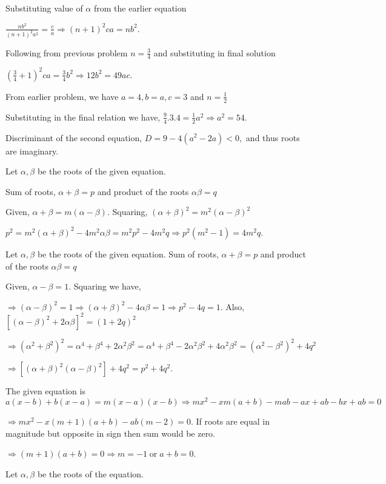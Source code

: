   Substituting value of $\alpha$ from the earlier equation

  $\frac{nb^2}{(n + 1)^2a^2} = \frac{c}{a} \Rightarrow (n + 1)^2 ca = nb^2$.
\item Following from previous problem $n = \frac{3}{4}$ and substituting in final solution

  $\left(\frac{3}{4} + 1\right)^2ca = \frac{3}{4}b^2 \Rightarrow 12b^2 = 49ac$.
\item From earlier problem, we have $a = 4, b = a, c = 3$ and $n = \frac{1}{2}$

  Substituting in the final relation we have, $\frac{9}{4}.3.4 = \frac{1}{2}a^2\Rightarrow a^2 = 54$.

  Discriminant of the second equation, $D = 9 - 4(a^2 - 2a) < 0,$ and thus roots are imaginary.
\item Let $\alpha, \beta$ be the roots of the given equation.

  Sum of roots, $\alpha + \beta = p$ and product of the roots $\alpha\beta = q$

  Given, $\alpha + \beta = m(\alpha - \beta)$. Squaring, $(\alpha + \beta)^2 = m^2(\alpha - \beta)^2$

  $p^2 = m^2(\alpha + \beta)^2 - 4m^2\alpha\beta = m^2p^2 - 4m^2q \Rightarrow p^2(m^2 - 1) = 4m^2q$.
\item Let $\alpha, \beta$ be the roots of the given equation. Sum of roots, $\alpha + \beta = p$ and product
  of the roots $\alpha\beta = q$

  Given, $\alpha - \beta = 1$. Squaring we have,

  $\Rightarrow (\alpha - \beta)^2 = 1 \Rightarrow (\alpha + \beta)^2 - 4\alpha\beta = 1\Rightarrow p^2 - 4q = 1$. Also,
  $[(\alpha - \beta)^2 + 2\alpha\beta]^2 = (1 + 2q)^2$

  $\Rightarrow (\alpha^2 + \beta^2)^2 = \alpha^4 + \beta^4 + 2\alpha^2\beta^2= \alpha^4 + \beta^4 - 2\alpha^2\beta^2 +
  4\alpha^2\beta^2 = (\alpha^2 - \beta^2)^2 + 4q^2$

  $\Rightarrow [(\alpha + \beta)^2(\alpha - \beta)^2] + 4q^2 = p^2 + 4q^2$.
\item The given equation is $a(x - b) + b(x - a) = m(x - a)(x - b)\Rightarrow mx^2 - xm(a + b) - mab - ax +
  ab - bx + ab = 0$

  $\Rightarrow mx^2 - x(m + 1)(a + b) - ab(m - 2) = 0$. If roots are equal in magnitude but opposite in sign
  then sum would be zero.

  $\Rightarrow (m + 1)(a + b) = 0 \Rightarrow m = -1\;\text{or}\;a + b = 0$.
\item Let $\alpha, \beta$ be the roots of the equation.


